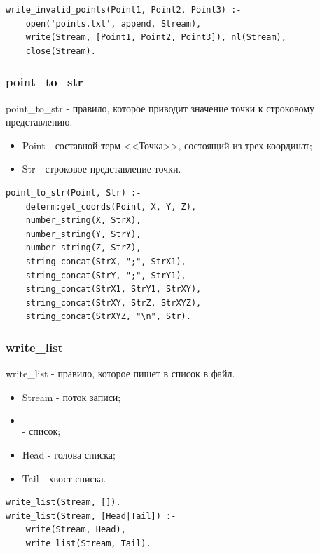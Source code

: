 \begin{lstlisting}[caption=Реализация правила write\_invalid\_points, label=rules:writeinvalidpoints]
write_invalid_points(Point1, Point2, Point3) :-
	open('points.txt', append, Stream),
	write(Stream, [Point1, Point2, Point3]), nl(Stream),
	close(Stream).
\end{lstlisting}

\subsubsection{point\_to\_str}
\hspace{0.6cm} point\_to\_str - правило, которое приводит значение точки к строковому представлению.

\begin{itemize}
	\item Point - составной терм <<Точка>>, состоящий из трех координат;
	\item Str - строковое представление точки.
\end{itemize}

\begin{lstlisting}[caption=Реализация правила point\_to\_str, label=rules:pointtostr]
point_to_str(Point, Str) :-
	determ:get_coords(Point, X, Y, Z),
	number_string(X, StrX),
	number_string(Y, StrY),
	number_string(Z, StrZ),
	string_concat(StrX, ";", StrX1),
	string_concat(StrY, ";", StrY1),
	string_concat(StrX1, StrY1, StrXY),
	string_concat(StrXY, StrZ, StrXYZ),
	string_concat(StrXYZ, "\n", Str).
\end{lstlisting}

\subsubsection{write\_list}
\hspace{0.6cm} write\_list - правило, которое пишет в список в файл.

\begin{itemize}
	\item Stream - поток записи;
	\item \[\] - список;
	\item Head - голова списка;
	\item Tail - хвост списка.
\end{itemize}

\begin{lstlisting}[caption=Реализация правила write\_list, label=rules:writelist]
write_list(Stream, []).
write_list(Stream, [Head|Tail]) :-
	write(Stream, Head),
	write_list(Stream, Tail).
\end{lstlisting}

